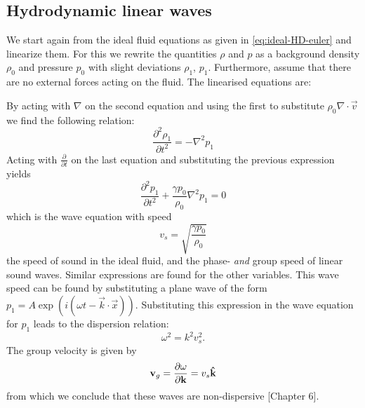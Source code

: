 \subsection{Hydrodynamic linear waves}
We start again from the ideal fluid equations as given in \cref{eq:ideal-HD-euler} and linearize them.
For this we rewrite the quantities $\rho$ and $p$ as a background density $\rho_0$ and pressure $p_0$ with slight deviations $\rho_1$, $p_1$.
Furthermore, assume that there are no external forces acting on the fluid. The linearised equations are:

{\centering 
\noindent {}
\par}
By acting with $\nabla$ on the second equation and using the first to substitute $\rho_0 \nabla \cdot \vec{v}$ we find the following relation:
\begin{equation*}
	\frac{\partial^2 \rho_1}{\partial t^2} = -\nabla^2 p_1
\end{equation*}
Acting with $ \frac{\partial}{\partial t}$ on the last equation and substituting the previous expression yields
\begin{equation*}
	\frac{\partial^2 p_1}{\partial t^2} + \frac{\gamma p_0}{\rho_0} \nabla^2 p_1 = 0
\end{equation*}
which is the wave equation with speed
\begin{equation}
v_s = \sqrt{ \frac{\gamma p_0}{\rho_0} }
\label{eq:sound-speed}
\end{equation}
the speed of sound in the ideal fluid, and the phase- \textit{and} group speed of linear sound waves.
Similar expressions are found for the other variables. This wave speed can be found by substituting a plane wave of the form $p_1 = A \exp \left( i(\omega t - \vec{k}\cdot\vec{x}) \right) $. Substituting this expression in the wave equation for $p_1$ leads to the dispersion relation:
\begin{equation}
	\omega^2 = k^2v_s^2.
\end{equation}
The group velocity is given by
\begin{equation}
	\mathbf{v}_{g} = \frac{\partial \omega}{\partial \mathbf{k}} = v_s\mathbf{\hat{k}}
	\label{eq:group-velocity}
\end{equation}
from which we conclude that these waves are non-dispersive \cite{notes-fluid-dynamics}[Chapter 6].

